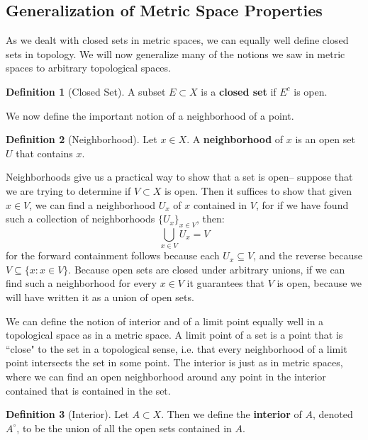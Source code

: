 \documentclass[11pt, oneside]{amsart}   	%
\theoremstyle{definition}
\newtheorem{definition}{Definition}[section]
\begin{document}
	\subsection{Generalization of Metric Space Properties}
	
	As we dealt with closed sets in metric spaces, we can equally well define closed sets in topology. We will now generalize many of the notions we saw in metric 
	spaces to arbitrary topological spaces.
	
	\begin{definition}[Closed Set]
		A subset $E\subset X$ is a \textbf{closed set} if $E^c$ is open.
	\end{definition}
	
	We now define the important notion of a neighborhood of a point.
	
	\begin{definition}[Neighborhood]
		Let $x\in X$. A \textbf{neighborhood} of $x$ is an open set $U$ that contains $x$.
	\end{definition}
	
	Neighborhoods give us a practical way to show that a set is open-- suppose that we are trying to determine if $V\subset X$ is open. Then it suffices to show 
	that given $x\in V$, we can find a neighborhood $U_x$ of $x$ contained in $V$, for if we have found such a collection of neighborhoods $\{U_x\}_{x\in V}$, 
	then:
	$$
		\bigcup_{x\in V}U_x = V
	$$
	for the forward containment follows because each $U_x\subseteq V$, and the reverse because $V\subseteq\{x : x\in V\}$. Because open sets are closed 
	under arbitrary unions, if we can find such a neighborhood for every $x\in V$ it guarantees that $V$ is open, because we will have written it as a union 
	of open sets.

	We can define the notion of interior and of a limit point equally well in a topological space as in a metric space. A limit point of a set is a point that is ``close" to 
	the set in a topological sense, i.e. that every neighborhood of a limit point intersects the set in some point. The interior is just as in metric spaces, where we 
	can find an open neighborhood around any point in the interior contained that is contained in the set.
	
	\begin{definition}[Interior]
		Let $A\subset X$. Then we define the \textbf{interior} of $A$, denoted $A^\circ$, to be the union of all the open sets contained in $A$.
	\end{definition}
	
\end{document}

